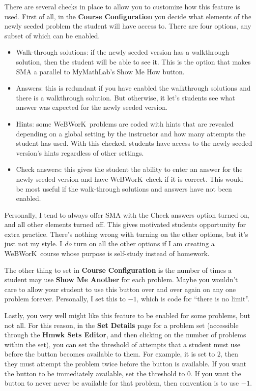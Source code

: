 \documentclass[12pt]{article}
\newcommand{\menu}[1]{\textbf{#1}}
\newcommand{\WW}{WeBWorK}
\newcommand{\HSE}{\menu{Hmwk Sets Editor}}
\begin{document}
There are several checks in place to allow you to customize how this feature is used.
First of all, in the \menu{Course Configuration} you decide what elements of the newly seeded problem the student will have access to.
There are four options, any subset of which can be enabled.
\begin{itemize}
	\item Walk-through solutions: if the newly seeded version has a walkthrough solution, then the student will be able to see it.
	      This is the option that makes SMA a parallel to MyMathLab's Show Me How button.
	\item Answers: this is redundant if you have enabled the walkthrough solutions and there is a walkthrough solution.
	      But otherwise, it let's students see what answer was expected for the newly seeded version.
	\item Hints: some \WW\ problems are coded with hints that are revealed depending on a global setting by the instructor and how many attempts the student has used.
	      With this checked, students have access to the newly seeded version's hints regardless of other settings.
	\item Check answers: this gives the student the ability to enter an answer for the newly seeded version and have \WW\ check if it is correct.
	      This would be most useful if the walk-through solutions and answers have not been enabled.
\end{itemize}

Personally, I tend to always offer SMA with the Check answers option turned on, and all other elements turned off.
This gives motivated students opportunity for extra practice.
There's nothing wrong with turning on the other options, but it's just not my style.
I \emph{do} turn on all the other options if I am creating a \WW\ course whose purpose is self-study instead of homework.

The other thing to set in \menu{Course Configuration} is the number of times a student may use \menu{Show Me Another} for each problem.
Maybe you wouldn't care to allow your student to use this button over and over again on any one problem forever.
Personally, I set this to $-1$, which is code for ``there is no limit''.

Lastly, you very well might like this feature to be enabled for some problems, but not all.
For this reason, in the \menu{Set Details} page for a problem set (accessible through the \HSE, and then clicking on the number of problems within the set), you can set the threshold of attempts that a student must use before the button becomes available to them.
For example, it is set to $2$, then they must attempt the problem twice before the button is available.
If you want the button to be immediately available, set the threshold to $0$.
If you want the button to never never be available for that problem, then convention is to use $-1$.
\end{document}

